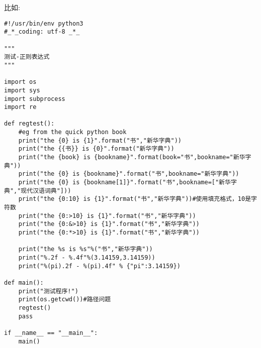 \documentclass[twoside,11pt]{book}
\begin{document}
比如:
\begin{lstlisting}
#!/usr/bin/env python3
#_*_coding: utf-8 _*_

"""
测试-正则表达式
"""

import os
import sys
import subprocess
import re

def regtest():
    #eg from the quick python book
    print("the {0} is {1}".format("书","新华字典"))
    print("the {{书}} is {0}".format("新华字典"))
    print("the {book} is {bookname}".format(book="书",bookname="新华字典"))
    print("the {0} is {bookname}".format("书",bookname="新华字典"))
    print("the {0} is {bookname[1]}".format("书",bookname=["新华字典","现代汉语词典"]))
    print("the {0:10} is {1}".format("书","新华字典"))#使用填充格式，10是字符数
    print("the {0:>10} is {1}".format("书","新华字典"))
    print("the {0:&>10} is {1}".format("书","新华字典"))
    print("the {0:*>10} is {1}".format("书","新华字典"))

    print("the %s is %s"%("书","新华字典"))
    print("%.2f - %.4f"%(3.14159,3.14159))
    print("%(pi).2f - %(pi).4f" % {"pi":3.14159})

def main():
    print("测试程序!")
    print(os.getcwd())#路径问题
    regtest()
    pass

if __name__ == "__main__":
    main()
\end{lstlisting}
\end{document}
